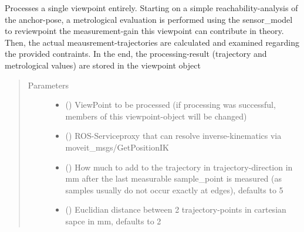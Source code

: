 \documentclass[letterpaper,10pt,english]{sphinxmanual}
\begin{document}
\begin{fulllineitems}
\begin{fulllineitems}
\label{\detokenize{module_trajectory_manager:agiprobot_measurement.trajectory_manager.TrajectoryManager.process_viewpoint}}
Processes a single viewpoint entirely. Starting on a simple reachability-analysis of the anchor-pose, a metrological evaluation is performed using the sensor\_model to
reviewpoint the measurement-gain this viewpoint can contribute in theory. Then, the actual meausrement-trajectories are calculated and examined regarding the
provided contraints. In the end, the processing-result (trajectory and metrological values) are stored in the viewpoint object
\begin{quote}\begin{description}
\item[{Parameters}] \leavevmode\begin{itemize}
\item {} 
 ({\hyperref[\detokenize{module_view:agiprobot_measurement.viewpoint.ViewPoint}]{}}) \textendash{} ViewPoint to be processed (if processing was successful, members of this viewpoint-object will be changed)

\item {} 
 () \textendash{} ROS-Serviceproxy that can resolve inverse-kinematics via moveit\_msgs/GetPositionIK

\item {} 
 (\sphinxstyleliteralemphasis{, }) \textendash{} How much to add to the trajectory in trajectory-direction in mm after the last measurable sample\_point is measured (as samples usually do not occur exactly at edges), defaults to 5

\item {} 
 (\sphinxstyleliteralemphasis{, }) \textendash{} Euclidian distance between 2 trajectory-points in cartesian sapce in mm, defaults to 2


\end{itemize}
\end{description}
\end{quote}
\end{fulllineitems}
\end{fulllineitems}
\end{document}
